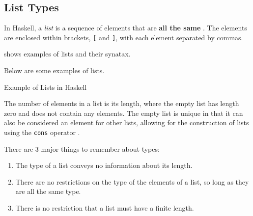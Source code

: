 \subsection{List Types}\label{subsec:List_Types}
\begin{definition}[List]\label{def:List}
  In Haskell, a \emph{list} is a sequence of elements that are \textbf{all the same }.
  The elements are enclosed within brackets, \texttt{[} and \texttt{]}, with each element separated by commas.

   shows examples of lists and their synatax.
\end{definition}

Below are some examples of lists.
\begin{listing}[h!tbp]
\caption{Example of Lists in Haskell}
\label{lst:List_Examples}
\end{listing}

The number of elements in a list is its length, where the empty list has length zero and does not contain any elements.
The empty list is unique in that it can also be considered an element for other lists, allowing for the construction of lists using the \texttt{cons} operator \haskellinline{:}.

There are 3 major things to remember about  types:
\begin{enumerate}[noitemsep]
\item The type of a list conveys no information about its length.
\item There are no restrictions on the type of the elements of a list, so long as they are all the same type.
\item There is no restriction that a list must have a finite length.
\end{enumerate}

